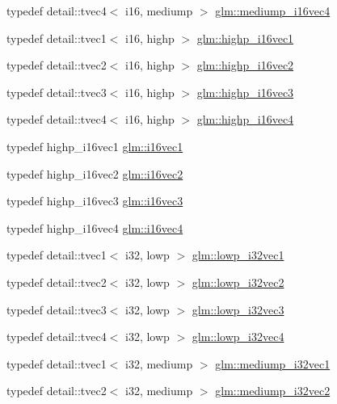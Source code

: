 \begin{DoxyCompactItemize}
typedef detail\+::tvec4$<$ i16, mediump $>$ \hyperlink{group__gtc__type__precision_gad9aca299fc3e96c84be6b063381c9f3e}{glm\+::mediump\+\_\+i16vec4}
\item 
typedef detail\+::tvec1$<$ i16, highp $>$ \hyperlink{group__gtc__type__precision_ga0ed3103e2d3acb4efbe313add4243a72}{glm\+::highp\+\_\+i16vec1}
\item 
typedef detail\+::tvec2$<$ i16, highp $>$ \hyperlink{group__gtc__type__precision_ga74df9e215c049f82d277473c4c974bb4}{glm\+::highp\+\_\+i16vec2}
\item 
typedef detail\+::tvec3$<$ i16, highp $>$ \hyperlink{group__gtc__type__precision_ga8dcfd412bd9ce99a1cf5c2b6e50f07e7}{glm\+::highp\+\_\+i16vec3}
\item 
typedef detail\+::tvec4$<$ i16, highp $>$ \hyperlink{group__gtc__type__precision_ga7fd6f1b3c224833cc330a2c64b6994dd}{glm\+::highp\+\_\+i16vec4}
\item 
typedef highp\+\_\+i16vec1 \hyperlink{group__gtc__type__precision_gaa3a2fe05ca6a7086c5580922ebda4bf3}{glm\+::i16vec1}
\item 
typedef highp\+\_\+i16vec2 \hyperlink{group__gtc__type__precision_ga13f7a88281faec6a72231dce73ce6129}{glm\+::i16vec2}
\item 
typedef highp\+\_\+i16vec3 \hyperlink{group__gtc__type__precision_ga22ec113d49837ef823048bb01511564c}{glm\+::i16vec3}
\item 
typedef highp\+\_\+i16vec4 \hyperlink{group__gtc__type__precision_ga28cd96ac55e2209bdbd3a41cb8af970a}{glm\+::i16vec4}
\item 
typedef detail\+::tvec1$<$ i32, lowp $>$ \hyperlink{group__gtc__type__precision_gadb82f1c8a0f4d3304862d32079961974}{glm\+::lowp\+\_\+i32vec1}
\item 
typedef detail\+::tvec2$<$ i32, lowp $>$ \hyperlink{group__gtc__type__precision_ga1ac855a9b4ef24908d00ab715e7ddbff}{glm\+::lowp\+\_\+i32vec2}
\item 
typedef detail\+::tvec3$<$ i32, lowp $>$ \hyperlink{group__gtc__type__precision_gaa4a0dd64d4253a3641225254670c7b95}{glm\+::lowp\+\_\+i32vec3}
\item 
typedef detail\+::tvec4$<$ i32, lowp $>$ \hyperlink{group__gtc__type__precision_ga99adefeda08a56345b0553d13283d2fa}{glm\+::lowp\+\_\+i32vec4}
\item 
typedef detail\+::tvec1$<$ i32, mediump $>$ \hyperlink{group__gtc__type__precision_ga44c6a3b78e635d91e35e1c41ab6b0ba1}{glm\+::mediump\+\_\+i32vec1}
\item 
typedef detail\+::tvec2$<$ i32, mediump $>$ \hyperlink{group__gtc__type__precision_gaef7b37956ce9e1cc4faecf21b7fdae8b}{glm\+::mediump\+\_\+i32vec2}

\end{DoxyCompactItemize}
